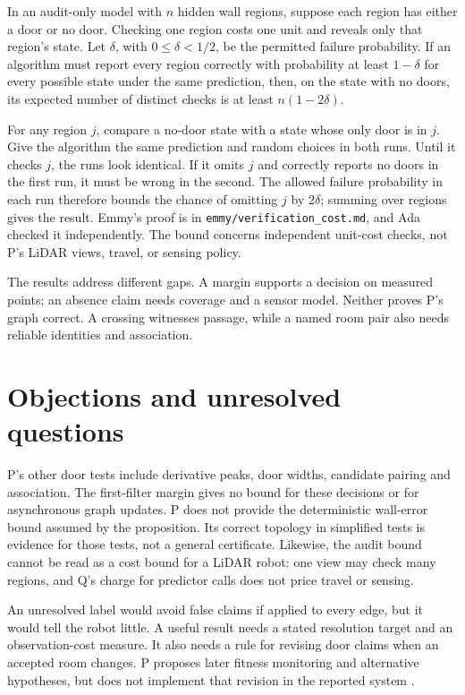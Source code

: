 \documentclass{article}
\begin{document}
\begin{proposition}
In an audit-only model with \(n\) hidden wall regions, suppose each region has either a door or no door.
Checking one region costs one unit and reveals only that region's state. Let \(\delta\), with
\(0\leq\delta<1/2\), be the permitted failure probability. If an algorithm must report every region correctly
with probability at least \(1-\delta\) for every possible state under the same prediction, then, on the state
with no doors, its expected number of distinct checks is at least \(n(1-2\delta)\).
\end{proposition}

For any region \(j\), compare a no-door state with a state whose only door is in \(j\). Give the algorithm the
same prediction and random choices in both runs. Until it checks \(j\), the runs look identical. If it omits
\(j\) and correctly reports no doors in the first run, it must be wrong in the second. The allowed failure
probability in each run therefore bounds the chance of omitting \(j\) by \(2\delta\); summing over regions
gives the result. Emmy's proof is in \texttt{emmy/verification\_cost.md}, and Ada checked it independently.
The bound concerns independent unit-cost checks, not P's LiDAR views, travel, or sensing policy.

The results address different gaps. A margin supports a decision on measured points; an absence claim needs
coverage and a sensor model. Neither proves P's graph correct. A crossing witnesses passage, while a named
room pair also needs reliable identities and association.

\section{Objections and unresolved questions}

P's other door tests include derivative peaks, door widths, candidate pairing and association. The
first-filter margin gives no bound for these decisions or for asynchronous graph updates. P does not provide
the deterministic wall-error bound assumed by the proposition. Its correct topology in simplified tests is
evidence for those tests, not a general certificate. Likewise, the audit bound cannot be read as a cost bound
for a LiDAR robot: one view may check many regions, and Q's charge for predictor calls does not price travel
or sensing.

An unresolved label would avoid false claims if applied to every edge, but it would tell the robot little. A
useful result needs a stated resolution target and an observation-cost measure. It also needs a rule for
revising door claims when an accepted room changes. P proposes later fitness monitoring and alternative
hypotheses, but does not implement that revision in the reported system \cite{P}.
\end{document}
